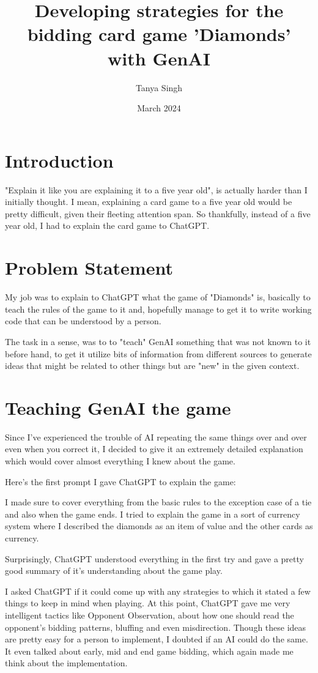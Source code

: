 \documentclass{article}
\title{Developing strategies for the bidding card game 'Diamonds' with GenAI}
\author{Tanya Singh}
\date{March 2024}
\begin{document}
\maketitle

\section{Introduction}
"Explain it like you are explaining it to a five year old", is actually harder than I initially thought. I mean, explaining a card game to a five year old would be pretty difficult, given their fleeting attention span. So thankfully, instead of a five year old, I had to explain the card game to ChatGPT.

\section{Problem Statement}
My job was to explain to ChatGPT what the game of "Diamonds" is, basically to teach the rules of the game to it and, hopefully manage to get it to write working code that can be understood by a person.

The task in a sense, was to to "teach" GenAI something that was not known to it before hand, to get it utilize bits of information from different sources to generate ideas that might be related to other things but are "new" in the given context. 


\section{Teaching GenAI the game}
Since I've experienced the trouble of AI repeating the same things over and over even when you correct it, I decided to give it an extremely detailed explanation which would cover almost everything I knew about the game.

Here's the first prompt I gave ChatGPT to explain the game:

I made sure to cover everything from the basic rules to the exception case of a tie and also when the game ends. I tried to explain the game in a sort of currency system where I described the diamonds as an item of value and the other cards as currency.

Surprisingly, ChatGPT understood everything in the first try and gave a pretty good summary of it's understanding about the game play.

I asked ChatGPT if it could come up with any strategies to which it stated a few things to keep in mind when playing. At this point, ChatGPT gave me very intelligent tactics like Opponent Observation, about how one should read the opponent's bidding patterns, bluffing and even misdirection. Though these ideas are pretty easy for a person to implement, I doubted if an AI could do the same. It even talked about early, mid and end game bidding, which again made me think about the implementation. 
\end{document}
